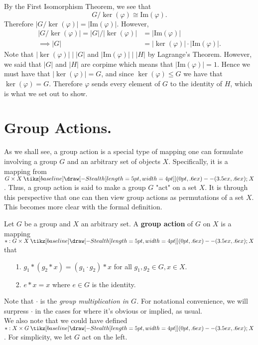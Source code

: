 \documentclass[12pt,letterpaper]{algebra_book}
\renewcommand{\to}{\mathbin{\tikz[baseline] \draw[-{Stealth[length=5pt,width=4pt]}] (0pt,.6ex) -- (3.5ex,.6ex);}}
\newcommand{\im}{\mbox{Im}}
\renewcommand{\phi}{\varphi}
\theoremstyle{definition}
\begin{document}
    \begin{prf}
        By the First Isomorphism Theorem, we see that 
        \[
            G/\ker(\phi) \cong \im(\phi).   
        \]
        Therefore $|G/\ker(\phi)| = |\im(\phi)|$. However, 
        \begin{align*}
            |G/\ker(\phi)| = |G|/|\ker(\phi)| &= |\im(\phi)|\\ 
            \implies |G| &= |\ker(\phi)| \cdot  |\im(\phi)|.
        \end{align*}
        Note that $|\ker(\phi)| \mid |G|$ and $|\im(\phi)| \mid |H|$ by
        Lagrange's Theorem. However, we said that $|G|$ and $|H|$ are
        corpime
        which means that $|\im(\phi)| = 1$. Hence we
        must have that $|\ker(\phi)| = G$, and since $\ker(\phi) \le G$ we
        have that $\ker(\phi) = G$. Therefore $\phi$ sends every element
        of $G$ to the identity of $H$, which is what we set out to show.
    \end{prf}


    \newpage
    \section{Group Actions.}
    As we shall see, a group action is a special type of mapping one can
    formulate involving a group $G$ and an arbitrary set of objects $X$.
    Specifically, it is a mapping from $G \times X \to X$.
    Thus, a group action is said to make a group $G$ "act" on a set
    $X$. It is through this perspective that one can then view group
    actions as permutations of a set $X$. This becomes more clear with
    the formal definition. 

    \begin{definition}
        Let $G$ be a group and $X$ an arbitrary set. A \textbf{group
        action} of $G$ on $X$ is a mapping $* : G \times X \to X$
        that 
        \begin{itemize}
            \item[1.] $g_1 * (g_2 * x) = (g_1 \cdot g_2) * x$ for
            all $g_1, g_2 \in G, x \in X$.

            \item[2.] $e * x = x$ where $e \in G$ is the identity.
        \end{itemize}
    \end{definition}
    Note that $\cdot$ is the \textit{group multiplication in $G$.} For
    notational convenience, we will surpress $\cdot$ in the cases for
    where it's obvious or implied, as usual.
    \\
    We also note that we could have defined $*:X \times G \to X$. For
    simplicity, we let $G$ act on the left.
    \\  
\end{document}
